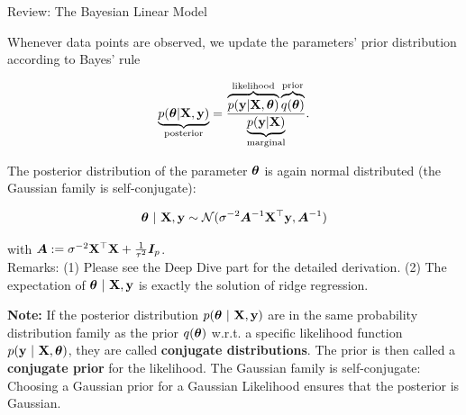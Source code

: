 \documentclass[11pt,compress,t,notes=noshow, xcolor=table]{beamer}
\begin{document}
\begin{vbframe}{Review: The Bayesian Linear Model}
    \lz 

    Whenever data points are observed, we update the parameters' prior distribution according to Bayes' rule 

    $$
    \underbrace{p(\bm{\theta} | \mathbf{X}, \mathbf{y})}_{\text{posterior}} = \frac{\overbrace{p(\mathbf{y} | \mathbf{X}, \bm{\theta})}^{\text{likelihood}}\overbrace{q(\bm{\theta})}^{\text{prior}}}{\underbrace{p(\mathbf{y}|\mathbf{X})}_{\text{marginal}}}. 
    $$

    \framebreak 

    The posterior distribution of the parameter $\bm{\theta}$ is again normal distributed (the Gaussian family is self-conjugate): 

    $$
    \bm{\theta} ~|~ \mathbf{X}, \mathbf{y} \sim \mathcal{N}(\sigma^{-2}\bm{A}^{-1}\mathbf{X}^\top\mathbf{y}, \bm{A}^{-1})
    $$

    with $\bm{A}:= \sigma^{-2}\mathbf{X}^\top\mathbf{X} + \frac{1}{\tau^2} \boldsymbol{I}_p$. \\
    
    Remarks: (1) Please see the Deep Dive part for the detailed derivation. (2) The expectation of $\bm{\theta} ~|~ \mathbf{X}, \mathbf{y}$ is exactly the solution of ridge regression.

    \lz 

    \begin{footnotesize}
    \textbf{Note:} If the posterior distribution $p(\bm{\theta}~|~\mathbf{X}, \mathbf{y})$ are in the same probability distribution family as the prior $q(\bm{\theta})$ w.r.t. a specific likelihood function $p(\mathbf{y}~|~\mathbf{X}, \bm{\theta})$, they are called \textbf{conjugate distributions}. The prior is then called a \textbf{conjugate prior} for the likelihood. The Gaussian family is self-conjugate: Choosing a Gaussian prior for a Gaussian Likelihood ensures that the posterior is Gaussian. 
    \end{footnotesize}

    \framebreak 
    

\end{vbframe}
\end{document}
